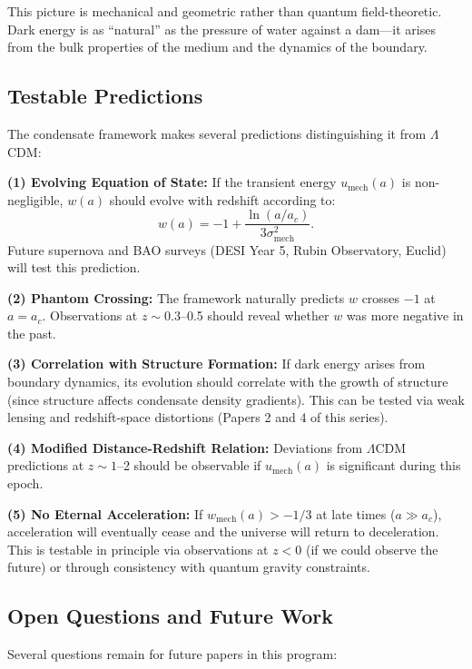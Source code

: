 \documentclass[11pt,a4paper]{article}
\newcommand{\umech}{\ensuremath{u_{\mathrm{mech}}}}
\newcommand{\wmech}{\ensuremath{w_{\mathrm{mech}}}}
\theoremstyle{definition}
\theoremstyle{remark}
\begin{document}
This picture is mechanical and geometric rather than quantum field-theoretic. Dark energy is as ``natural'' as the pressure of water against a dam---it arises from the bulk properties of the medium and the dynamics of the boundary.

\subsection{Testable Predictions}
\label{sec:predictions}

The condensate framework makes several predictions distinguishing it from $\Lambda$CDM:

\textbf{(1) Evolving Equation of State:} If the transient energy $\umech(a)$ is non-negligible, $w(a)$ should evolve with redshift according to:
\begin{equation}
w(a) = -1 + \frac{\ln(a/a_c)}{3\sigma_{\mathrm{mech}}^2}.
\end{equation}
Future supernova and BAO surveys (DESI Year 5, Rubin Observatory, Euclid) will test this prediction.

\textbf{(2) Phantom Crossing:} The framework naturally predicts $w$ crosses $-1$ at $a = a_c$. Observations at $z \sim 0.3$--0.5 should reveal whether $w$ was more negative in the past.

\textbf{(3) Correlation with Structure Formation:} If dark energy arises from boundary dynamics, its evolution should correlate with the growth of structure (since structure affects condensate density gradients). This can be tested via weak lensing and redshift-space distortions (Papers 2 and 4 of this series).

\textbf{(4) Modified Distance-Redshift Relation:} Deviations from $\Lambda$CDM predictions at $z \sim 1$--2 should be observable if $\umech(a)$ is significant during this epoch.

\textbf{(5) No Eternal Acceleration:} If $\wmech(a) > -1/3$ at late times ($a \gg a_c$), acceleration will eventually cease and the universe will return to deceleration. This is testable in principle via observations at $z < 0$ (if we could observe the future) or through consistency with quantum gravity constraints.

\subsection{Open Questions and Future Work}
\label{sec:future_work}

Several questions remain for future papers in this program:
\end{document}
